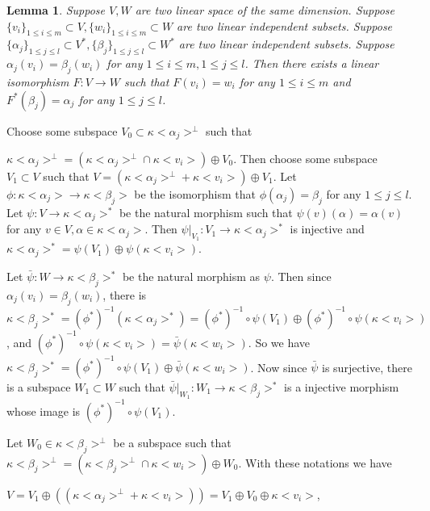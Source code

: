 \def\CTEXPreproc{Created by ctex v0.2.12, don't edit!}\documentclass[11pt]{article}
\newtheorem{lem}{Lemma}[section]
\begin{document}
\begin{lem}
Suppose $V,W$ are two linear space of the same dimension. Suppose $\{ v_i \} _{1\leq i\leq m} \subset V ,
 \{ w_i \} _{1\leq i\leq m } \subset W  $ are two linear independent subsets. Suppose
 $\{  \alpha_j  \} _{1\leq j\leq l   } \subset V^* , \{ \beta_j \}_{1\leq j\leq l }\subset W^* $ are two linear independent subsets.
 Suppose $\alpha_j ( v_i  )  =\beta_j ( w_i  ) $ for any $1\leq i\leq m , 1\leq j\leq l$.
 Then there exists a linear isomorphism $F: V\rightarrow W$ such that $F(v_i )= w_i $  for any $1\leq i\leq m$ and
 $F^* ( \beta_j  )= \alpha_j $ for any $  1\leq j\leq l $.
\end{lem}

\begin{pf} Choose some subspace $V_0 \subset \kappa< \alpha_j >^{\perp} $ such that

$\kappa<\alpha_j >^{\perp}=( \kappa<\alpha_j>^{\perp}\cap \kappa<v_i> ) \oplus V_0    $. Then choose some subspace $V_1 \subset V$ such that
$V= ( \kappa<\alpha_j>^{\perp} + \kappa<v_i>   )\oplus V_1 $. Let $\phi: \kappa<\alpha_j>\rightarrow \kappa<\beta_j>$ be the isomorphism that $\phi(\alpha_j)=\beta_j$ for any $1\leq j\leq l$. Let $\psi: V\rightarrow \kappa<\alpha_j>^*$ be the natural morphism such that
$\psi(v)(\alpha)=\alpha(v)  $ for any $v\in V, \alpha\in \kappa<\alpha_j>$. Then $\psi|_{V_1}: V_1 \rightarrow \kappa<\alpha_j>^*$ is injective and $ \kappa<\alpha_j>^* = \psi(V_1)\oplus \psi(\kappa<v_i>) $.

Let $\bar{\psi}: W\rightarrow \kappa<\beta_j>^*$ be the natural morphism as $\psi$. Then since $\alpha_j ( v_i  )  =\beta_j ( w_i  )$, there is $\kappa<\beta_j>^*=  ( \phi^*  )^{-1}( \kappa<\alpha_j >^*  ) = ( \phi^*  )^{-1}\circ \psi (V_1)  \oplus (\phi^*)^{-1}\circ \psi (\kappa<v_i>)   $, and $(\phi^*)^{-1}\circ \psi (\kappa<v_i>) =\bar{\psi}(\kappa<w_i>)  $.  So  we have
$\kappa<\beta_j>^* = (\phi^*)^{-1}\circ\psi(V_1)\oplus \bar{\psi}(\kappa<w_i>) $. Now since $\bar{\psi}$ is surjective, there is a subspace $W_1 \subset W$ such that $\bar{\psi}|_{W_1}: W_1 \rightarrow \kappa<\beta_j>^*$ is a injective morphism whose image is $(\phi^*)^{-1}\circ\psi(V_1)$.

Let $W_0 \in \kappa<\beta_j>^{\perp}$ be a subspace such that
$\kappa<\beta_j>^{\perp}=(\kappa<\beta_j>^{\perp}\cap \kappa<w_i>)\oplus W_0$.  With these notations we have

$V= V_1 \oplus ( (\kappa<\alpha_j>^{\perp}+\kappa<v_i>)  )= V_1 \oplus V_0 \oplus \kappa<v_i> $,


\end{pf}
\end{document}
